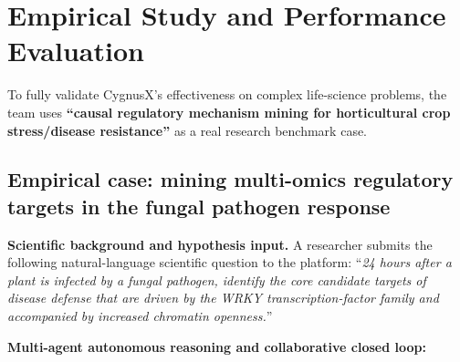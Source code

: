 \documentclass[11pt,a4paper]{article}
\begin{document}
\section{Empirical Study and Performance Evaluation}

To fully validate CygnusX's effectiveness on complex life-science problems, the team uses \textbf{``causal regulatory mechanism mining for horticultural crop stress/disease resistance''} as a real research benchmark case.

\subsection{Empirical case: mining multi-omics regulatory targets in the fungal pathogen response}

\textbf{Scientific background and hypothesis input.} A researcher submits the following natural-language scientific question to the platform: ``\emph{24 hours after a plant is infected by a fungal pathogen, identify the core candidate targets of disease defense that are driven by the WRKY transcription-factor family and accompanied by increased chromatin openness.}''

\textbf{Multi-agent autonomous reasoning and collaborative closed loop:}
\end{document}
